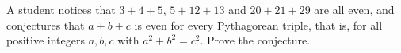 A student notices that $3+4+5$, $5+12+13$ and $20+21+29$ are all even, and conjectures that $a+b+c$ is even for every Pythagorean triple, that is, for all positive integers $a,b,c$ with $a^2+b^2=c^2$. Prove the conjecture.
